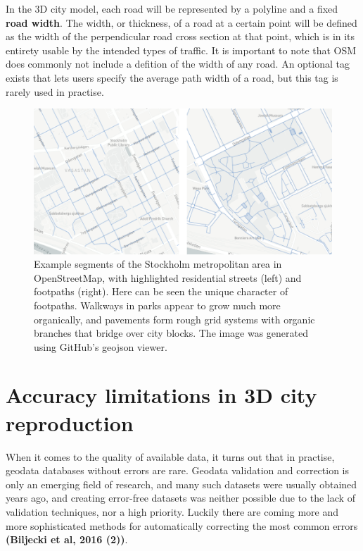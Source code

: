 \documentclass{kththesis}
\begin{document}
In the 3D city model, each road will be represented by a polyline and a fixed \textbf{road width}. The width, or thickness, of a road at a certain point will be defined as the width of the perpendicular road cross section at that point, which is in its entirety usable by the intended types of traffic.
It is important to note that OSM does commonly not include a defition of the width of any road. An optional tag exists that lets users specify the average path width of a road, but this tag is rarely used in practise.

\begin{figure}[H]
    \centering
    \includegraphics[width=\textwidth,height=0.5\textheight,keepaspectratio]{img_map_residential_footpath_compare}
    \caption{Example segments of the Stockholm metropolitan area in OpenStreetMap, with highlighted residential streets (left) and footpaths (right). Here can be seen the unique character of footpaths. Walkways in parks appear to grow much more organically, and pavements form rough grid systems with organic branches that bridge over city blocks. The image was generated using GitHub's geojson viewer.}
    \label{fig:residential-footpath-map}
\end{figure}

\section{Accuracy limitations in 3D city reproduction}

When it comes to the quality of available data, it turns out that in practise, geodata databases without errors are rare.
Geodata validation and correction is only an emerging field of research, and many such datasets were usually obtained years ago, and creating error-free datasets was neither possible due to the lack of validation techniques, nor a high priority.
Luckily there are coming more and more sophisticated methods for automatically correcting the most common errors
\textbf{(Biljecki et al, 2016 (2))}.
\end{document}
